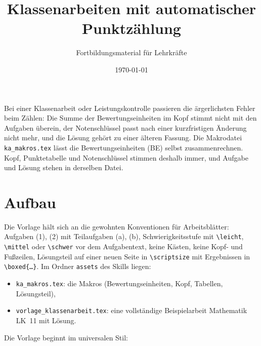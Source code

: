 



\title{Klassenarbeiten mit automatischer Punktzählung}
\author{Fortbildungsmaterial für Lehrkräfte}
\date{\today}
\pagestyle{plain}
\setlength{\parskip}{1.5em} %
\setlength{\emergencystretch}{4em} %




\maketitle

Bei einer Klassenarbeit oder Leistungskontrolle passieren die ärgerlichsten Fehler beim Zählen: Die Summe der Bewertungseinheiten im Kopf stimmt nicht mit den Aufgaben überein, der Notenschlüssel passt nach einer kurzfristigen Änderung nicht mehr, und die Lösung gehört zu einer älteren Fassung. Die Makrodatei \texttt{ka\_makros.tex} lässt  die Bewertungseinheiten (BE) selbst zusammenrechnen. Kopf, Punktetabelle und Notenschlüssel stimmen deshalb immer, und Aufgabe und Lösung stehen in derselben Datei.

\tableofcontents



\section{Aufbau}

Die Vorlage hält sich an die gewohnten Konventionen für Arbeitsblätter: Aufgaben (1), (2) mit Teilaufgaben (a), (b), Schwierigkeitsstufe mit \texttt{\textbackslash leicht}, \texttt{\textbackslash mittel} oder \texttt{\textbackslash schwer} vor dem Aufgabentext, keine Kästen, keine Kopf- und Fußzeilen, Lösungsteil auf einer neuen Seite in \texttt{\textbackslash scriptsize} mit Ergebnissen in \texttt{\textbackslash boxed\{\dots\}}. Im Ordner \texttt{assets} des Skills liegen:

\begin{itemize}
	\item \texttt{ka\_makros.tex}: die Makros (Bewertungseinheiten, Kopf, Tabellen, Lösungsteil),
	\item \texttt{vorlage\_klassenarbeit.tex}: eine vollständige Beispielarbeit Mathematik LK~11 mit Lösung.
\end{itemize}

Die Vorlage beginnt im universalen Stil:

